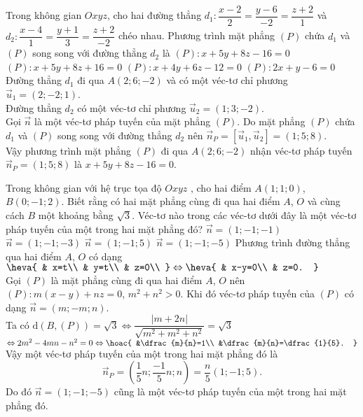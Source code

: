 \begin{ex}%
	Trong không gian $Oxyz$, cho hai đường thẳng $d_1\colon\dfrac{x-2}{2}=\dfrac{y-6}{-2}=\dfrac{z+2}{1}$ và $d_2\colon\dfrac{x-4}{1}=\dfrac{y+1}{3}=\dfrac{z+2}{-2}$ chéo nhau. Phương trình mặt phẳng $(P)$ chứa $d_1$ và $(P)$ song song với đường thẳng $d_2$ là
	\choice
	{\True $(P)\colon x+5y+8z-16=0$}
	{$(P)\colon x+5y+8z+16=0$}
	{$(P)\colon x+4y+6z-12=0$}
	{$(P)\colon 2x+y-6=0$}
	\loigiai
	{
		Đường thẳng $d_1$ đi qua $ A\left(2;6;-2\right)$ và có một véc-tơ chỉ phương $\overrightarrow{u}_1=\left(2;-2;1\right)$.\\
		Đường thẳng $d_2$ có một véc-tơ chỉ phương $\overrightarrow{u}_2=(1;3;-2)$.\\
		Gọi $\overrightarrow{n}$ là một véc-tơ pháp tuyến của mặt phẳng $(P)$. Do mặt phẳng $(P)$ chứa $d_1$ và $(P)$ song song với đường thẳng $d_2$ nên $\overrightarrow{n}_P=\left[\overrightarrow{u}_1,\overrightarrow{u}_2\right]=(1;5;8)$.\\
		Vậy phương trình mặt phẳng $(P)$ đi qua $ A(2;6;-2)$ nhận véc-tơ pháp tuyến $\overrightarrow{n}_P=(1;5;8)$ là $ x+5y+8z-16=0$.}
\end{ex}

\begin{ex}%
	Trong không gian với hệ trục tọa độ $Oxyz$ , cho hai điểm $ A(1;1;0)$, $ B(0;-1;2)$. Biết rằng có hai mặt phẳng cùng đi qua hai điểm $ A$, $ O$ và cùng cách $ B$ một khoảng bằng $\sqrt{3}$. Véc-tơ nào trong các véc-tơ dưới đây là một véc-tơ pháp tuyến của một trong hai mặt phẳng đó?
	\choice
	{$\overrightarrow{n}=(1;-1;-1)$}
	{$\overrightarrow{n}=(1;-1;-3)$}
	{\True $\overrightarrow{n}=(1;-1;5)$}
	{$\overrightarrow{n}=(1;-1;-5)$}
	\loigiai
	{
		Phương trình đường thẳng qua hai điểm $ A$, $ O$ có dạng $\heva{
			& x=t\\ 
			& y=t\\ 
			& z=0\\ 
		}\Leftrightarrow\heva{
			& x-y=0\\ 
			& z=0.
		}$\\
		Gọi $(P)$ là mặt phẳng cùng đi qua hai điểm $ A$, $ O$ nên $(P)\colon  m\left(x-y\right)+nz=0$, $m^2+n^2>0$. Khi đó véc-tơ pháp tuyến của $(P)$ có dạng $\overrightarrow{n}=(m;-m;n)$.\\
		Ta có $ \mathrm{d}\left(B,(P)\right)=\sqrt{3}\Leftrightarrow\dfrac{\left| m+2n\right|}{\sqrt{m^2+m^2+n^2}}=\sqrt{3}$ $\Leftrightarrow 2m^2-4mn-n^2=0\Leftrightarrow\hoac{
			&\dfrac{m}{n}=1\\ 
			&\dfrac{m}{n}=\dfrac{1}{5}.
		}$\\
		Vậy một véc-tơ pháp tuyến của một trong hai mặt phẳng đó là $$\overrightarrow{n}_P=\left(\dfrac{1}{5}n; \dfrac{-1}{5}n; n\right)=\dfrac{n}{5}\left(1; -1; 5\right).$$
		Do đó $\overrightarrow{n}=(1;-1;-5)$ cũng là một véc-tơ pháp tuyến của một trong hai mặt phẳng đó.}
\end{ex}

